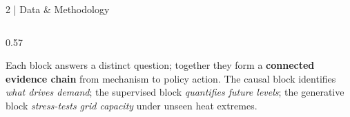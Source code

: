 \documentclass[aspectratio=169, 10pt]{beamer}
\begin{document}
\begin{frame}{2 \;|\; Data \& Methodology}
\begin{columns}[T]
\begin{column}{0.57\textwidth}

\vspace{0.4em}
\small
Each block answers a distinct question; together they form a
\textbf{connected evidence chain} from mechanism to policy action.
The causal block identifies \emph{what drives demand}; the supervised
block \emph{quantifies future levels}; the generative block
\emph{stress-tests grid capacity} under unseen heat extremes.

\end{column}
\end{columns}

\end{frame}
\end{document}
